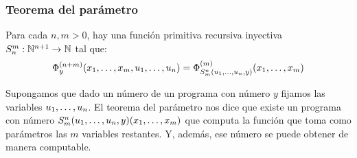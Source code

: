 \subsubsection{Teorema del parámetro}

\begin{teorema}\label{teorema::parametro}
Para cada $n,m > 0$, hay una función primitiva recursiva inyectiva $S_n^m:\mathbb{N}^{n+1}\to\mathbb{N}$ tal que:
$$\Phi_y^{(n+m)}(x_1,\dots, x_{m},u_1,\dots, u_{n}) = \Phi^{(m)}_{S^n_m(u_1,\dots, u_{n},y)}(x_1,\dots, x_{m})$$  
\end{teorema}

Supongamos que dado un número de un programa con número $y$ fijamos las variables $u_1,\dots, u_{n}$. El teorema del parámetro nos dice que existe un programa con número $S^n_m(u_1,\dots, u_{n},y)(x_1,\dots, x_{m})$ que computa la función que toma como parámetros las $m$ variables restantes. Y, además, ese número se puede obtener de manera computable. 


